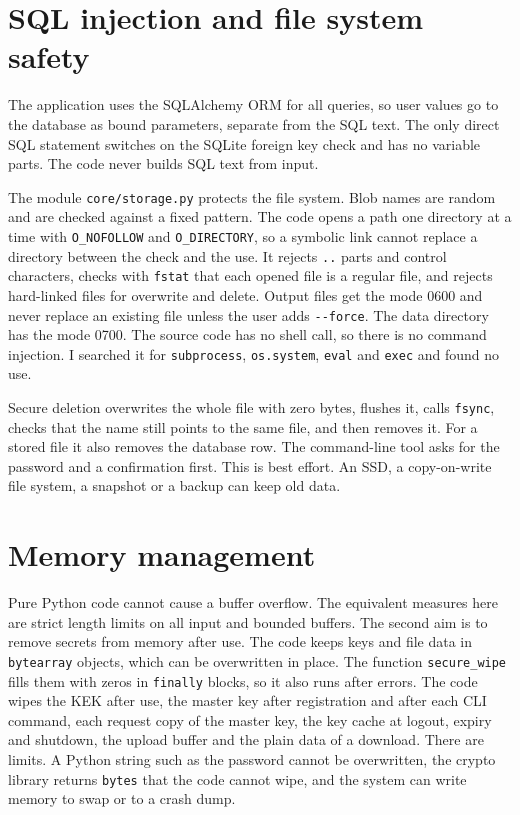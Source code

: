 \section{SQL injection and file system safety}

The application uses the SQLAlchemy ORM for all queries, so user values go to the database as bound parameters, separate from the SQL text. The only direct SQL statement switches on the SQLite foreign key check and has no variable parts. The code never builds SQL text from input.

The module \texttt{core/storage.py} protects the file system. Blob names are random and are checked against a fixed pattern. The code opens a path one directory at a time with \texttt{O\_NOFOLLOW} and \texttt{O\_DIRECTORY}, so a symbolic link cannot replace a directory between the check and the use. It rejects \texttt{..} parts and control characters, checks with \texttt{fstat} that each opened file is a regular file, and rejects hard-linked files for overwrite and delete. Output files get the mode 0600 and never replace an existing file unless the user adds \texttt{-{}-force}. The data directory has the mode 0700. The source code has no shell call, so there is no command injection. I searched it for \texttt{subprocess}, \texttt{os.system}, \texttt{eval} and \texttt{exec} and found no use.

Secure deletion overwrites the whole file with zero bytes, flushes it, calls \texttt{fsync}, checks that the name still points to the same file, and then removes it. For a stored file it also removes the database row. The command-line tool asks for the password and a confirmation first. This is best effort. An SSD, a copy-on-write file system, a snapshot or a backup can keep old data.

\section{Memory management}

Pure Python code cannot cause a buffer overflow. The equivalent measures here are strict length limits on all input and bounded buffers. The second aim is to remove secrets from memory after use. The code keeps keys and file data in \texttt{bytearray} objects, which can be overwritten in place. The function \texttt{secure\_wipe} fills them with zeros in \texttt{finally} blocks, so it also runs after errors. The code wipes the KEK after use, the master key after registration and after each CLI command, each request copy of the master key, the key cache at logout, expiry and shutdown, the upload buffer and the plain data of a download. There are limits. A Python string such as the password cannot be overwritten, the crypto library returns \texttt{bytes} that the code cannot wipe, and the system can write memory to swap or to a crash dump.

